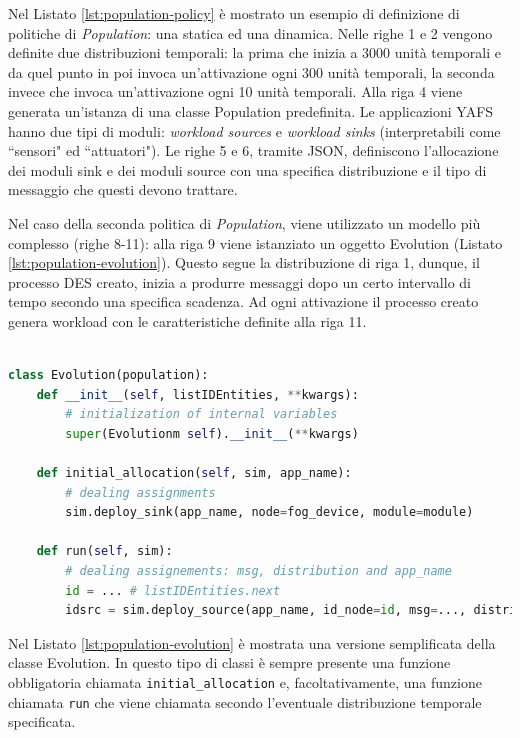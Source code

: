 Nel Listato \ref{lst:population-policy} è mostrato un esempio di definizione di politiche di \textit{Population}: una statica ed una dinamica. Nelle righe 1 e 2 vengono definite due distribuzioni temporali: la prima che inizia a 3000 unità temporali e da quel punto in poi invoca un'attivazione ogni 300 unità temporali, la seconda invece che invoca un'attivazione ogni 10 unità temporali. Alla riga 4 viene generata un'istanza di una classe Population predefinita. Le applicazioni YAFS hanno due tipi di moduli: \textit{workload sources} e \textit{workload sinks} (interpretabili come ``sensori" ed ``attuatori"). Le righe 5 e 6, tramite JSON, definiscono l'allocazione dei moduli sink e dei moduli source con una specifica distribuzione e il tipo di messaggio che questi devono trattare.

Nel caso della seconda politica di \textit{Population}, viene utilizzato un modello più complesso (righe 8-11): alla riga 9 viene istanziato un oggetto Evolution (Listato \ref{lst:population-evolution}). Questo segue la distribuzione di riga 1, dunque, il processo DES creato, inizia a produrre messaggi dopo un certo intervallo di tempo secondo una specifica scadenza. Ad ogni attivazione il processo creato genera workload con le caratteristiche definite alla riga 11.

\begin{lstlisting}[language=python, caption={Struttura di una classe Population. \cite{YAFSSimulator}}, captionpos=b, label={lst:population-evolution}]

class Evolution(population):
	def __init__(self, listIDEntities, **kwargs):
		# initialization of internal variables
		super(Evolutionm self).__init__(**kwargs)
	
	def initial_allocation(self, sim, app_name):
		# dealing assignments
		sim.deploy_sink(app_name, node=fog_device, module=module)
	
	def run(self, sim):
		# dealing assignements: msg, distribution and app_name
		id = ... # listIDEntities.next
		idsrc = sim.deploy_source(app_name, id_node=id, msg=..., distribution=...)

\end{lstlisting}

Nel Listato \ref{lst:population-evolution} è mostrata una versione semplificata della classe Evolution. In questo tipo di classi è sempre presente una funzione obbligatoria chiamata \texttt{initial\_allocation} e, facoltativamente, una funzione chiamata \texttt{run} che viene chiamata secondo l'eventuale distribuzione temporale specificata.

